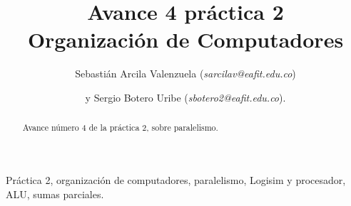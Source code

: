 \documentclass[%
	final,
	notitlepage,
	narroweqnarray,
	inline,
	twoside,
	]{ieee}
\begin{document}
\title[Avance  práctica 2]{%
       Avance 4 práctica 2 \\  Organización de Computadores}

\author[]{Sebastián Arcila Valenzuela (\textit{sarcilav@eafit.edu.co})
\and{}y Sergio Botero Uribe (\textit{sbotero2@eafit.edu.co}).
}


\titletext{, \today} 


\maketitle               

\begin{abstract} 
Avance número 4 de la práctica 2, sobre paralelismo.
\end{abstract}

\begin{keywords}
Práctica 2, organización de computadores, paralelismo, Logisim y procesador, ALU, sumas parciales.
\end{keywords}
\end{document}
